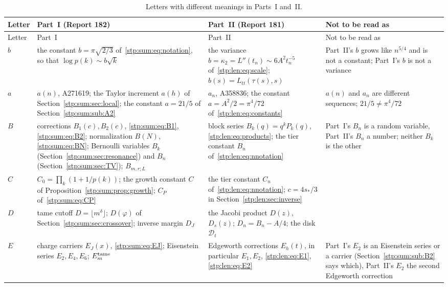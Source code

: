 \documentclass[11pt]{article}
\theoremstyle{remark}\newtheorem{remark}[theorem]{Remark}
\begin{document}
\begin{small}
\begin{longtable}{@{}>{\raggedright\arraybackslash}p{}>{\raggedright\arraybackslash}p{}>{\raggedright\arraybackslash}p{}>{\raggedright\arraybackslash}p{}@{}}
\caption{Letters with different meanings in Parts~I and~II.}\label{stp:tab:notation}\\
\toprule
Letter & Part~I (Report 182) & Part~II (Report 181) & Not to be read as\\
\midrule
\endfirsthead
\toprule
Letter & Part~I & Part~II & Not to be read as\\
\midrule
\endhead
$b$ & the constant $b=\pi\sqrt{2/3}$ of~\eqref{stp:sum:eq:notation}, so that $\log p(k)\sim b\sqrt k$ & the variance $b=\kappa_2=L''(t_n)\sim6A^2t_n^{-5}$ of~\eqref{stp:len:eq:scale}; $b(s)=L_{tt}(\tau(s),s)$ & Part~II's $b$ grows like $n^{5/4}$ and is not a constant; Part~I's $b$ is not a variance\\
$a$ & $a(n)$, A271619; the Taylor increment $a(h)$ of Section~\ref{stp:sum:sec:local}; the constant $a=21/5$ of Section~\ref{stp:sum:sub:A2} & $a_n$, A358836; the constant $a=A^2/2=\pi^4/72$ of~\eqref{stp:len:eq:constants} & $a(n)$ and $a_n$ are different sequences; $21/5\ne\pi^4/72$\\
$B$ & corrections $B_1(c),B_2(c)$, \eqref{stp:sum:eq:B1}, \eqref{stp:sum:eq:B2}; normalization $B(N)$, \eqref{stp:sum:eq:BN}; Bernoulli variables $B_k$ (Section~\ref{stp:sum:sec:resonance}) and $B_n$ (Section~\ref{stp:sum:sec:TV}); $B_{m,r;L}$ & block series $B_k(q)=q^kP_k(q)$, \eqref{stp:len:eq:products}; the tier constant $B_n$ of~\eqref{stp:len:eq:nnotation} & Part~I's $B_n$ is a random variable, Part~II's $B_n$ a number; neither $B_k$ is the other\\
$C$ & $C_0=\prod_k(1+1/p(k))$; the growth constant $C$ of Proposition~\ref{stp:sum:prop:growth}; $C_P$ of~\eqref{stp:sum:eq:CP} & the tier constant $C_n$ of~\eqref{stp:len:eq:nnotation}; $c=4s_*/3$ in Section~\ref{stp:len:sec:inverse} & \\
$D$ & tame cutoff $D=\lfloor m^\delta\rfloor$; $D(\varphi)$ of Section~\ref{stp:sum:sec:crossover}; inverse margin $D_J$ & the Jacobi product $D(z)$, $D_s(z)$; $D_n=B_n-A/4$; the disk $\mathcal D_t$ & \\
$E$ & charge carriers $E_J(x)$, \eqref{stp:sum:eq:EJ}; Eisenstein series $E_2,E_4,E_6$; $E_m^{\rm tame}$ & Edgeworth corrections $E_h(t)$, in particular $E_1,E_2$, \eqref{stp:len:eq:E1}, \eqref{stp:len:eq:E2} & Part~I's $E_2$ is an Eisenstein series or a carrier (Section~\ref{stp:sum:sub:B2} says which), Part~II's $E_2$ the second Edgeworth correction\\

\end{longtable}
\end{small}
\end{document}
